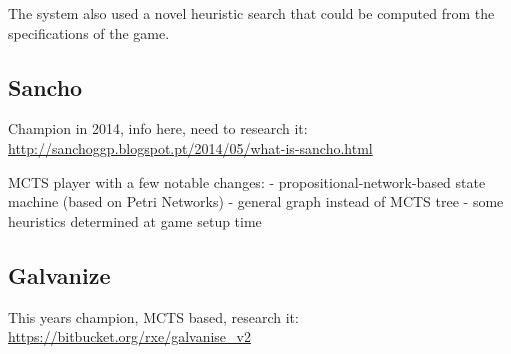 The system also used a novel heuristic search that could be computed from the specifications of the game.


\subsection{Sancho}
Champion in 2014, info here, need to research it: \url{http://sanchoggp.blogspot.pt/2014/05/what-is-sancho.html}

MCTS player with a few notable changes:
- propositional-network-based state machine (based on Petri Networks)
- general graph instead of MCTS tree
- some heuristics determined at game setup time

\subsection{Galvanize}
This years champion, MCTS based, research it:
\url{https://bitbucket.org/rxe/galvanise_v2}

